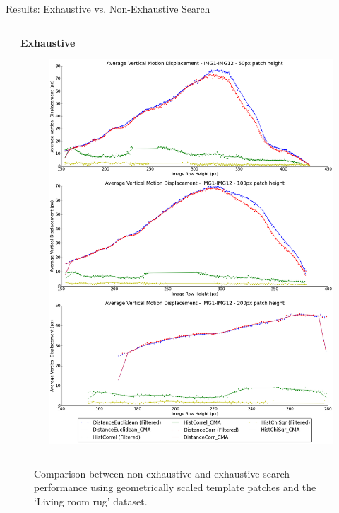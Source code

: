 \documentclass[10pt, compress]{beamer}
\begin{document}
\begin{frame}{Results: Exhaustive vs. Non-Exhaustive Search}
\begin{columns}[T]
\begin{column}{.48\textwidth}
\end{column}%
\hfill%
\begin{column}{.48\textwidth}

\textbf{Exhaustive}
\begin{figure}[ht!]
\centering
\vspace{0.1cm}
\includegraphics[scale=0.11]{flat_10cm_scaled_exhaustive}
\end{figure}

\end{column}%
\end{columns}

\begin{figure}[ht!]
\caption{Comparison between non-exhaustive and exhaustive search performance using geometrically scaled template patches and the `Living room rug' dataset.}
\end{figure}

\end{frame}
\end{document}
